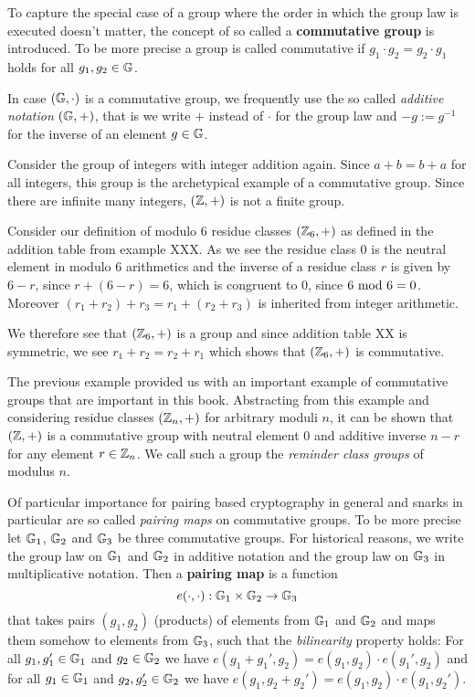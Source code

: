 To capture the special case of a group where the order in which the group law is executed doesn't matter, the concept of so called a \textbf{commutative group} is introduced. To be more precise a group is called commutative if  $g_1\cdot g_2 = g_2 \cdot g_1$ holds for all $g_1,g_2\in\mathbb{G}$.
\begin{notation}
In case $(\mathbb{G},\cdot)$ is a commutative group, we frequently use the so called \textit{additive notation} $(\mathbb{G},+)$, that is we write $+$ instead of $\cdot$ for the group law and $-g:=g^{-1}$ for the inverse of an element $g\in\mathbb{G}$.
\end{notation}
\begin{example} Consider the group of integers with integer addition again.
Since $a+b=b+a$ for all integers, this group is the archetypical example of a commutative group. Since there are infinite many integers, $(\mathbb{Z},+)$ is not a finite group.
\end{example}
\begin{example} Consider our definition of modulo $6$ residue classes $(\mathbb{Z}_6,+)$ as defined in the addition table from example XXX. As we see the residue class $0$ is the neutral element in modulo $6$ arithmetics and the inverse of a residue class $r$ is given by $6-r$, since $r+(6-r)=6$, which is congruent to $0$, since $6 \text{ mod } 6=0$. Moreover $(r_1+r_2)+r_3=r_1+(r_2+r_3)$ is inherited from integer arithmetic.

We therefore see that $(\mathbb{Z}_6,+)$ is a group and since addition table XX is symmetric, we see $r_1+r_2 = r_2+r_1$ which shows that $(\mathbb{Z}_6,+)$ is commutative.
\end{example}
The previous example provided us with an important example of commutative groups that are important in this book. Abstracting from this example and considering residue classes $(\mathbb{Z}_n,+)$ for arbitrary moduli $n$, it can be shown that $(\mathbb{Z},+)$ is a commutative group with neutral element $0$ and additive inverse $n-r$ for any element $r\in\mathbb{Z}_n$. We call such a group the \textit{reminder class groups} of modulus $n$.

Of particular importance for pairing based cryptography in general and snarks in particular are so called \textit{pairing maps} on commutative groups. To be more precise let $\mathbb{G}_1$, $\mathbb{G}_2$ and $\mathbb{G}_3$ be three commutative groups. For historical reasons, we write the group law on $\mathbb{G}_1$ and $\mathbb{G}_2$ in additive notation and the group law on $\mathbb{G}_3$ in multiplicative notation. Then a \textbf{pairing map} is a function
\begin{equation}
e(\cdot,\cdot): \mathbb{G}_1 \times \mathbb{G}_2 \to \mathbb{G}_3
\end{equation}
that takes pairs $(g_1,g_2)$ (products) of elements from $\mathbb{G}_1$ and $\mathbb{G}_2$ and maps them somehow to elements from $\mathbb{G}_3$, such that the \textit{bilinearity} property holds: For all $g_1,g_1'\in \mathbb{G}_1$ and $g_2\in \mathbb{G}_2$ we have $e(g_1+ g_1',g_2)= e(g_1,g_2)\cdot e(g_1',g_2)$ and for all $g_1\in \mathbb{G}_1$ and $g_2, g_2'\in \mathbb{G}_2$ we have $e(g_1,g_2+ g_2')= e(g_1,g_2)\cdot e(g_1,g_2')$.

